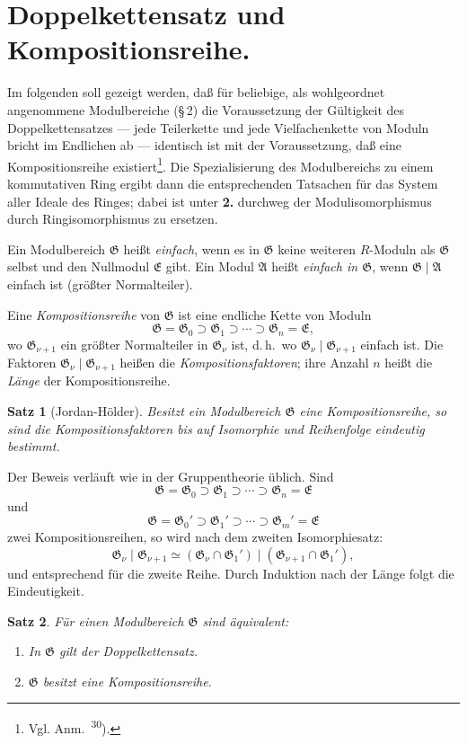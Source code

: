 \documentclass[12pt,a4paper]{article}
\newcommand{\fG}{\mathfrak{G}}
\newcommand{\fA}{\mathfrak{A}}
\newcommand{\fE}{\mathfrak{E}}
\theoremstyle{plain}
\newtheorem{Satz}{Satz}[section]
\theoremstyle{definition}
\theoremstyle{remark}
\begin{document}
\newpage
\section{Doppelkettensatz und Kompositionsreihe.}

\noindent
Im folgenden soll gezeigt werden, daß für beliebige, als wohlgeordnet angenommene Modulbereiche (\S\,2) die Voraussetzung der Gültigkeit des Doppelkettensatzes --- jede Teilerkette und jede Vielfachenkette von Moduln bricht im Endlichen ab --- identisch ist mit der Voraussetzung, daß eine Kompositionsreihe existiert\footnote{Vgl. Anm.\ \textsuperscript{30}).}. Die Spezialisierung des Modulbereichs zu einem kommutativen Ring ergibt dann die entsprechenden Tatsachen für das System aller Ideale des Ringes; dabei ist unter \textbf{2.} durchweg der Modulisomorphismus durch Ringisomorphismus zu ersetzen.

Ein Modulbereich $\fG$ heißt \textit{einfach}, wenn es in $\fG$ keine weiteren $R$-Moduln als $\fG$ selbst und den Nullmodul $\fE$ gibt. Ein Modul $\fA$ heißt \textit{einfach in $\fG$}, wenn $\fG \mid \fA$ einfach ist (größter Normalteiler).

Eine \textit{Kompositionsreihe} von $\fG$ ist eine endliche Kette von Moduln
\[
\fG = \fG_{0} \supset \fG_{1} \supset \cdots \supset \fG_{n} = \fE,
\]
wo $\fG_{\nu+1}$ ein größter Normalteiler in $\fG_{\nu}$ ist, d.\,h.\ wo $\fG_{\nu} \mid \fG_{\nu+1}$ einfach ist. Die Faktoren $\fG_{\nu} \mid \fG_{\nu+1}$ heißen die \textit{Kompositionsfaktoren}; ihre Anzahl $n$ heißt die \textit{Länge} der Kompositionsreihe.

\begin{Satz}[Jordan-Hölder]
Besitzt ein Modulbereich $\fG$ eine Kompositionsreihe, so sind die Kompositionsfaktoren bis auf Isomorphie und Reihenfolge eindeutig bestimmt.
\end{Satz}

Der Beweis verläuft wie in der Gruppentheorie üblich. Sind
\[
\fG = \fG_{0} \supset \fG_{1} \supset \cdots \supset \fG_{n} = \fE
\]
und
\[
\fG = \fG_{0}' \supset \fG_{1}' \supset \cdots \supset \fG_{m}' = \fE
\]
zwei Kompositionsreihen, so wird nach dem zweiten Isomorphiesatz:
\[
\fG_{\nu} \mid \fG_{\nu+1} \simeq (\fG_{\nu} \cap \fG_{1}') \mid (\fG_{\nu+1} \cap \fG_{1}'),
\]
und entsprechend für die zweite Reihe. Durch Induktion nach der Länge folgt die Eindeutigkeit.

\begin{Satz}
Für einen Modulbereich $\fG$ sind äquivalent:
\begin{enumerate}
    \item[(1)] In $\fG$ gilt der Doppelkettensatz.
    \item[(2)] $\fG$ besitzt eine Kompositionsreihe.
\end{enumerate}
\end{Satz}
\end{document}
